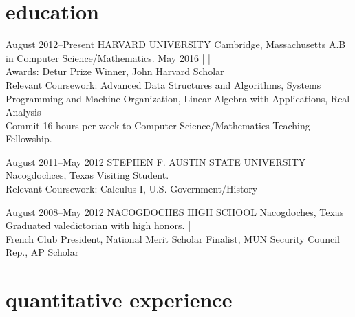 \documentclass[]{friggeri-cv} %
\begin{document}

\section{education}

\entry
{August 2012--Present}
{HARVARD UNIVERSITY}
{Cambridge, Massachusetts}
{A.B in Computer Science/Mathematics. 
May 2016 |
 | 
\\
Awards: Detur Prize Winner, John Harvard Scholar \\
Relevant Coursework: Advanced Data Structures and Algorithms,  Systems Programming and Machine Organization, Linear Algebra with Applications, Real Analysis \\
Commit 16 hours per week to Computer Science/Mathematics Teaching Fellowship.\\
}
\begin{detailed}

\entry
{August 2011--May 2012}
{STEPHEN F. AUSTIN STATE UNIVERSITY}
{Nacogdochces, Texas}
{Visiting Student. \\
Relevant Coursework: Calculus I, U.S. Government/History \\
}
\end{detailed}

\entry
{August 2008--May 2012}
{NACOGDOCHES HIGH SCHOOL}
{Nacogdoches, Texas}
{Graduated valedictorian with high honors.  | \\
French Club President, National Merit Scholar Finalist, MUN Security Council Rep., AP Scholar}



\section{quantitative experience}
\end{document}
